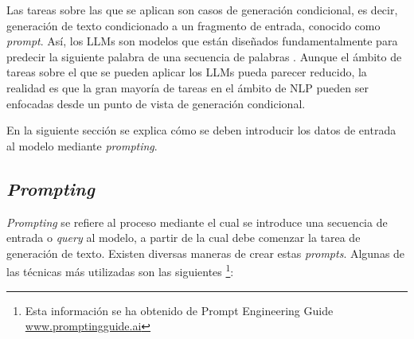 \documentclass[11pt,spanish,listoffigures,listoftables]{tfgetsinf}
\begin{document}
Las tareas sobre las que se aplican son casos de generación condicional, es decir, generación de texto condicionado a un fragmento de entrada, conocido como \textit{prompt}. Así, los LLMs son modelos que están diseñados fundamentalmente para predecir la siguiente palabra de una secuencia de palabras \cite{jurafsky2023speech}. Aunque el ámbito de tareas sobre el que se pueden aplicar los LLMs pueda parecer reducido, la realidad es que la gran mayoría de tareas en el ámbito de NLP pueden ser enfocadas desde un punto de vista de generación condicional.

En la siguiente sección se explica cómo se deben introducir los datos de entrada al modelo mediante \textit{prompting}.

\subsection{\textit{Prompting}} \label{prompting}

\textit{Prompting} se refiere al proceso mediante el cual se introduce una secuencia de entrada o \textit{query} al modelo, a partir de la cual debe comenzar la tarea de generación de texto. Existen diversas maneras de crear estas \textit{prompts}. Algunas de las técnicas más utilizadas son las siguientes \footnote{Esta  información se ha obtenido de Prompt Engineering Guide \url{www.promptingguide.ai}}:
\end{document}
